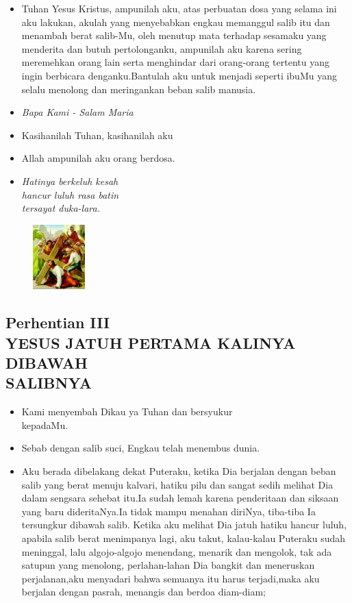 \documentclass[a5paper,headsepline,titlepage,10pt,nnormalheadings,DIVcalc]{scrbook}
\newcommand{\BU}[1]{\begin{itemize} \item[U:] #1 \end{itemize}}
\newcommand{\BP}[1]{\begin{itemize} \item[P:] #1 \end{itemize}}
\begin{document}
\BU{ Tuhan Yesus Kristus, ampunilah aku, atas perbuatan dosa yang selama ini aku lakukan, akulah yang menyebabkan engkau memanggul salib itu dan menambah berat salib-Mu, oleh menutup mata terhadap sesamaku yang menderita dan butuh pertolonganku, ampunilah aku karena sering meremehkan orang lain serta menghindar dari orang-orang tertentu yang ingin berbicara denganku.Bantulah aku untuk menjadi seperti ibuMu yang selalu menolong dan meringankan beban salib manusia.}

\large\begin{itemize}\item[~]\it{Bapa Kami - Salam Maria}\end{itemize}\normalsize
\BP{Kasihanilah Tuhan, kasihanilah aku}
   \BU{Allah ampunilah aku orang berdosa.}

\begin{itemize}
\item[2.] \it{Hatinya berkeluh kesah\\ hancur luluh rasa batin\\
    tersayat duka-lara.}
\end{itemize}

\begin{figure}
\includegraphics[width=2cm]{jalansalib_files/03_small.jpg}
\end{figure}
\subsection*{Perhentian III\\
YESUS JATUH PERTAMA KALINYA DIBAWAH\\SALIBNYA}

\BP{ Kami menyembah Dikau ya Tuhan dan bersyukur\\kepadaMu.}
\BU{ Sebab dengan salib suci, Engkau telah menembus dunia.}

\BP{ Aku berada dibelakang dekat Puteraku, ketika Dia berjalan dengan beban salib yang berat menuju kalvari, hatiku pilu dan sangat sedih melihat Dia dalam sengsara sehebat itu.Ia sudah lemah karena penderitaan dan siksaan yang baru dideritaNya.Ia tidak mampu menahan diriNya, tiba-tiba Ia tersungkur dibawah salib. Ketika aku melihat Dia jatuh hatiku hancur luluh, apabila salib berat menimpanya lagi, aku takut, kalau-kalau Puteraku sudah meninggal, lalu algojo-algojo menendang, menarik dan mengolok, tak ada satupun yang menolong, perlahan-lahan Dia bangkit dan meneruskan perjalanan,aku menyadari bahwa semuanya itu harus terjadi,maka aku berjalan dengan pasrah,  menangis dan berdoa diam-diam;}
\end{document}
